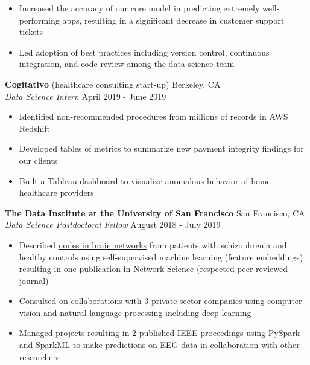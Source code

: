 \documentclass[line,margin,10pt]{res}
\begin{document}
\begin{resume}
\begin{itemize}
\item Increased the accuracy of our core model in predicting extremely well-performing apps, resulting in a significant decrease in customer support tickets
\item Led adoption of best practices including version control, continuous integration, and code review among the data science team
\end{itemize}
{\vspace{-0.25cm}}
\textbf{Cogitativo} (healthcare consulting start-up) \hfill Berkeley, CA\\
{\sl Data Science Intern} \hfill April 2019 - June 2019
\begin{itemize} \itemsep -2pt
\item Identified non-recommended procedures from millions of records in AWS Redshift
\item Developed tables of metrics to summarize new payment integrity findings for our clients
\item Built a Tableau dashboard to visualize anomalous behavior of home healthcare providers
\end{itemize}
{\vspace{-0.25cm}}
\textbf{The Data Institute at the University of San Francisco} \hfill San Francisco, CA \\
{\sl Data Science Postdoctoral Fellow} \hfill August 2018 - July 2019
\begin{itemize} \itemsep -2pt
\item Described \href{https://www.youtube.com/watch?v=8Ng_aMgIZLw&feature=youtu.be}{nodes in brain networks} from patients with schizophrenia and healthy controls using self-supervised machine learning (feature embeddings) resulting in one publication in Network Science (respected peer-reviewed journal)
\item Consulted on collaborations with 3 private sector companies using computer vision and natural language processing including deep learning
\item Managed projects resulting in 2 published IEEE proceedings using PySpark and SparkML to make predictions on EEG data in collaboration with other researchers

\end{itemize}
\end{resume}
\end{document}
